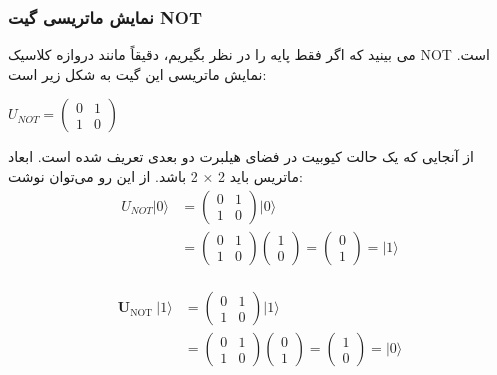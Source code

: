 \documentclass{book}
\begin{document}
\subsubsection{نمایش ماتریسی گیت NOT}

می بینید که اگر فقط پایه را در نظر بگیریم، دقیقاً مانند دروازه کلاسیک NOT است. نمایش ماتریسی این گیت به شکل زیر است:
\begin{center}
	$U_{NOT} =
	 \begin{pmatrix}
	 	0 & 1\\
	 	1 & 0
		\end{pmatrix}$
\end{center}

از آنجایی که یک حالت کیوبیت در فضای هیلبرت دو بعدی تعریف شده است. ابعاد ماتریس باید 2 × 2 باشد. از این رو می‌توان نوشت:
$$
\begin{aligned}
	U_{N O T}|0\rangle & =\left(\begin{array}{ll}
		0 & 1 \\
		1 & 0
	\end{array}\right)|0\rangle \\
	& =\left(\begin{array}{ll}
		0 & 1 \\
		1 & 0
	\end{array}\right)\left(\begin{array}{l}
		1 \\
		0
	\end{array}\right)=\left(\begin{array}{l}
		0 \\
		1
	\end{array}\right)=|1\rangle
\end{aligned}
$$\\

$$
\begin{aligned}
	\boldsymbol{U}_{\text {NOT }}|1\rangle & =\left(\begin{array}{ll}
		0 & 1 \\
		1 & 0
	\end{array}\right)|1\rangle \\
	& =\left(\begin{array}{ll}
		0 & 1 \\
		1 & 0
	\end{array}\right)\left(\begin{array}{l}
		0 \\
		1
	\end{array}\right)=\left(\begin{array}{l}
		1 \\
		0
	\end{array}\right)=|0\rangle
\end{aligned}
$$
\end{document}

